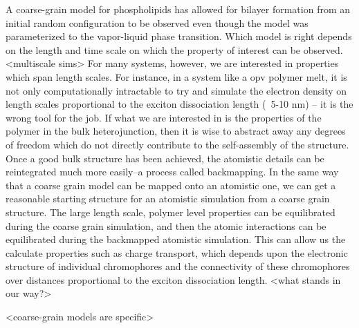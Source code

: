 A coarse-grain model for phospholipids has allowed for bilayer formation from an initial random configuration to be observed even though the model was parameterized to the vapor-liquid phase transition.\cite{Shelley2001}
Which model is right depends on the length and time scale on which the property of interest can be observed.
<multiscale sims>
For many systems, however, we are interested in properties which span length scales.
For instance, in a system like a opv polymer melt, it is not only computationally intractable to try and simulate the electron density on length scales proportional to the exciton dissociation length (~5-10 nm)\cite{Huang2010} -- it is the wrong tool for the job.
If what we are interested in is the properties of the polymer in the bulk heterojunction, then it is wise to abstract away any degrees of freedom which do not directly contribute to the self-assembly of the structure.
Once a good bulk structure has been achieved, the atomistic details can be reintegrated much more easily--a process called backmapping.
In the same way that a coarse grain model can be mapped onto an atomistic one, we can get a reasonable starting structure for an atomistic simulation from a coarse grain structure.
The large length scale, polymer level properties can be equilibrated during the coarse grain simulation, and then the atomic interactions can be equilibrated during the backmapped atomistic simulation.
This can allow us the calculate properties such as charge transport, which depends upon the electronic structure of individual chromophores and the connectivity of these chromophores over distances proportional to the exciton dissociation length.
<what stands in our way?>

<coarse-grain models are specific>

